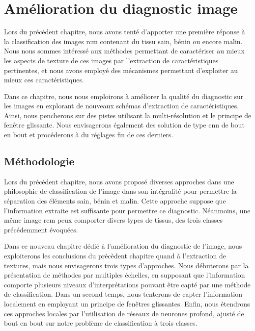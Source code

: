 \chapter{Amélioration du diagnostic image}
\label{chap:chapter_5}
\chapterintro
Lors du précédent chapitre, nous avons tenté d'apporter une première réponse à la classification des images \gls{rcm} contenant du tissu sain, bénin ou encore malin. Nous nous sommes intéressé aux méthodes permettant de caractériser au mieux les aspects de texture de ces images par l'extraction de caractéristiques pertinentes, et nous avons employé des mécanismes permettant d'exploiter au mieux ces caractéristiques.\par

Dans ce chapitre, nous nous emploirons à améliorer la qualité du diagnostic sur les images en explorant de nouveaux schémas d'extraction de caractéristiques. Ainsi, nous pencherons sur des pistes utilisant la multi-résolution et le principe de fenêtre glissante. Nous envisagerons également des solution de type \gls{cnn} de bout en bout et procéderons à du réglages fin de ces derniers.\par

\newpage

\section{Méthodologie}
Lors du précédent chapitre, nous avons proposé diverses approches dans une philosophie de classification de l'image dans son intégralité pour permettre la séparation des éléments sain, bénin et malin. Cette approche suppose que l'information extraite est suffisante pour permettre ce diagnostic. Néanmoins, une même image \gls{rcm} peux comporter divers types de tissus, des trois classes précédemment évoquées.\par

Dans ce nouveau chapitre dédié à l'amélioration du diagnostic de l'image, nous exploiterons les conclusions du précèdent chapitre quand à l'extraction de textures, mais nous envisagerons trois types d'approches. Nous débuterons par la présentation de méthodes par multiples échelles, en supposant que l'information comporte plusieurs niveaux d'interprétations pouvant être capté par une méthode de classification. Dans un second temps, nous tenterons de capter l'information localement en employant un principe de fenêtres glissantes. Enfin, nous étendrons ces approches locales par l'utilisation de réseaux de neurones profond, ajusté de bout en bout sur notre problème de classification à trois classes.\par

